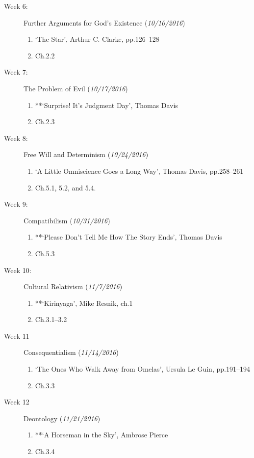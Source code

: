 \documentclass[article,oneside]{memoir}
\begin{document}
\begin{description}
\item[Week 6:] Further Arguments for God's Existence (\emph{10/10/2016})
\begin{enumerate}
\item `The Star', Arthur C. Clarke, pp.126--128
\item Ch.2.2
\end{enumerate}

\item[Week 7:] The Problem of Evil  (\emph{10/17/2016})
\begin{enumerate}
\item **`Surprise! It's Judgment Day', Thomas Davis
\item Ch.2.3
\end{enumerate}

\item[Week 8:] Free Will and Determinism (\emph{10/24/2016})
\begin{enumerate}
\item `A Little Omniscience Goes a Long Way', Thomas Davis, pp.258--261
\item Ch.5.1, 5.2, and 5.4.
\end{enumerate}

\item[Week 9:] Compatibilism (\emph{10/31/2016})
\begin{enumerate}
\item **`Please Don't Tell Me How The Story Ends', Thomas Davis
\item Ch.5.3
\end{enumerate}


\item[Week 10:] Cultural Relativism  (\emph{11/7/2016})
\begin{enumerate}
\item **`Kirinyaga', Mike Resnik, ch.1
\item Ch.3.1--3.2
\end{enumerate}

\item[Week 11]  Consequentialism (\emph{11/14/2016})
\begin{enumerate}
\item  `The Ones Who Walk Away from Omelas', Ursula Le Guin, pp.191--194 
\item Ch.3.3
\end{enumerate}

\item[Week 12]  Deontology  (\emph{11/21/2016})
\begin{enumerate}
\item **`A Horseman in the Sky', Ambrose Pierce
\item Ch.3.4


\end{enumerate}
\end{description}
\end{document}
